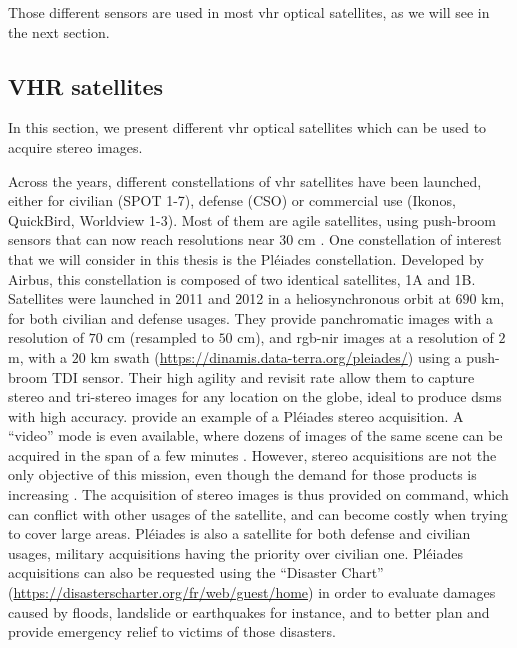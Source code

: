 Those different sensors are used in most \acrfull{vhr} optical satellites, as we will see in the next section.

\subsection{VHR satellites}
In this section, we present different \acrshort{vhr} optical satellites which can be used to acquire stereo images. 

Across the years, different constellations of \acrshort{vhr} satellites have been launched, either for civilian (SPOT 1-7), defense (CSO) or commercial use (Ikonos, QuickBird, Worldview 1-3). Most of them are agile satellites, using push-broom sensors that can now reach resolutions near 30 cm \cite{cnes_imagerie_2008, coffer_vertical_2022}. One constellation of interest that we will consider in this thesis is the Pléiades constellation. Developed by Airbus, this constellation is composed of two identical satellites, 1A and 1B. Satellites were launched in 2011 and 2012 in a heliosynchronous orbit at $690$ km, for both civilian and defense usages. They provide panchromatic images with a resolution of $70$ cm (resampled to $50$ cm), and \acrshort{rgb}-\acrshort{nir} images at a resolution of $2$ m, with a $20$ km swath (\url{https://dinamis.data-terra.org/pleiades/}) using a push-broom TDI sensor. Their high agility and revisit rate allow them to capture stereo and tri-stereo images for any location on the globe, ideal to produce \acrshort{dsm}s with high accuracy.  provide an example of a Pléiades stereo acquisition. A ``video'' mode is even available, where dozens of images of the same scene can be acquired in the span of a few minutes \cite{lebegue_pleiades-hr_2015}. However, stereo acquisitions are not the only objective of this mission, even though the demand for those products is increasing \cite{berthier_glacier_2014, poli_radiometric_2015, rieg_pleiades_2018, loghin_potential_2020}. The acquisition of stereo images is thus provided on command, which can conflict with other usages of the satellite, and can become costly when trying to cover large areas. Pléiades is also a satellite for both defense and civilian usages, military acquisitions having the priority over civilian one. Pléiades acquisitions can also be requested using the ``Disaster Chart'' (\url{https://disasterscharter.org/fr/web/guest/home}) in order to evaluate damages caused by floods, landslide or earthquakes for instance, and to better plan and provide emergency relief to victims of those disasters.

